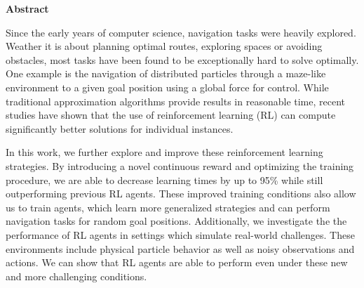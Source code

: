 \documentclass[%
  a4paper,%
  11pt,%
  style=print,
  blue,%
  bibliography=totoc,
  nexus,
  lnum,
  extramargin,
  table
  ]{tubsbook}
\begin{document}
\thispagestyle{plain} %
\centerline{\bfseries Abstract}
\vspace*{1em}
\noindent
Since the early years of computer science, navigation tasks were heavily explored. Weather it is about planning optimal routes, exploring spaces or avoiding obstacles, most tasks have been found to be exceptionally hard to solve optimally. One example is the navigation of distributed particles through a maze-like environment to a given goal position using a global force for control. While traditional approximation algorithms provide results in reasonable time, recent studies have shown that the use of reinforcement learning (RL) can compute significantly better solutions for individual instances.

In this work, we further explore and improve these reinforcement learning strategies. By introducing a novel continuous reward and optimizing the training procedure, we are able to decrease learning times by up to 95\% while still outperforming previous RL agents. These improved training conditions also allow us to train agents, which learn more generalized strategies and can perform navigation tasks for random goal positions. Additionally, we investigate the the performance of RL agents in settings which simulate real-world challenges. These environments include physical particle behavior as well as noisy observations and actions. We can show that RL agents are able to perform even under these new and more challenging conditions.  

\cleardoublepage

\tableofcontents
\cleardoublepage

\listoffigures
\cleardoublepage

\listoftables
\cleardoublepage

\listofalgorithms
\cleardoublepage



\mainmatter


















\appendix


\end{document}
